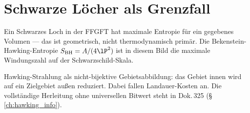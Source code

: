 \section{Schwarze Löcher als Grenzfall}

Ein Schwarzes Loch in der FFGFT hat maximale Entropie für ein gegebenes
Volumen --- das ist geometrisch, nicht thermodynamisch primär.
Die Bekenstein-Hawking-Entropie $S_{\text{BH}} = A/(4\lP^2)$ ist in
diesem Bild die maximale Windungszahl auf der Schwarzschild-Skala.

Hawking-Strahlung als nicht-bijektive Gebietsabbildung: das Gebiet innen
wird auf ein Zielgebiet außen reduziert. Dabei fallen Landauer-Kosten an.
Die vollständige Herleitung ohne universellen Bitwert steht in Dok.\,325
(\S\,\ref{ch:hawking_info}). 
